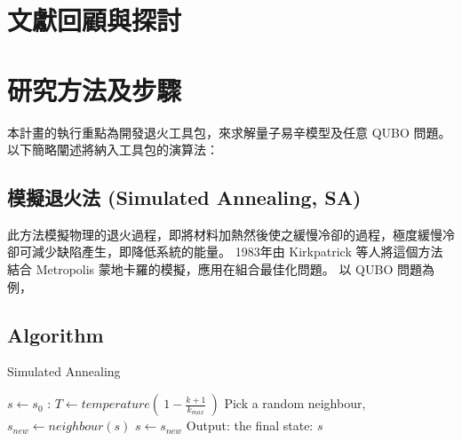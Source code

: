 \documentclass[12pt]{article}
\begin{document}
\section{文獻回顧與探討}



\section{研究方法及步驟}
本計畫的執行重點為開發退火工具包，來求解量子易辛模型及任意 QUBO 問題。
以下簡略闡述將納入工具包的演算法：

\subsection*{模擬退火法 (Simulated Annealing, SA)}
此方法模擬物理的退火過程，即將材料加熱然後使之緩慢冷卻的過程，極度緩慢冷卻可減少缺陷產生，即降低系統的能量。
1983年由 Kirkpatrick 等人將這個方法結合 Metropolis 蒙地卡羅的模擬，應用在組合最佳化問題。
以 QUBO 問題為例， 

\subsection*{Algorithm}

\begin{algorithm}
\caption{Simulated Annealing}\label{alg:SA}
\begin{algorithmic}
    \State $s \gets s_0$
:
    \State $T \gets temperature(~ 1 - \frac{k+1}{k_{max}} ~)$
    \State Pick a random neighbour, $s_{new} \gets neighbour(s)$
    \State $s \gets s_{new}$
\EndIf
\EndWhile
    \State Output: the final state: $s$
\end{algorithmic}
\end{algorithm}
\end{document}
